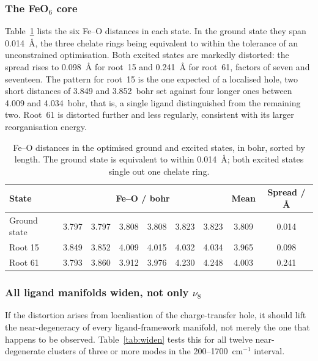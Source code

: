 \documentclass[11pt,a4paper]{article}
\newcommand{\wn}{\ensuremath{\mathrm{cm^{-1}}}}
\begin{document}
\subsubsection*{The FeO$_6$ core}

Table~\ref{tab:feo} lists the six Fe--O distances in each state. In the ground
state they span 0.014~\AA{}, the three chelate rings being equivalent to within
the tolerance of an unconstrained optimisation. Both excited states are
markedly distorted: the spread rises to 0.098~\AA{} for root~15 and 0.241~\AA{}
for root~61, factors of seven and seventeen. The pattern for root~15 is the
one expected of a localised hole, two short distances of 3.849 and
3.852~bohr set against four longer ones between 4.009 and 4.034~bohr, that is,
a single ligand distinguished from the remaining two. Root~61 is distorted
further and less regularly, consistent with its larger reorganisation energy.

\begin{table}[htbp]
\centering
\caption{Fe--O distances in the optimised ground and excited states, in bohr,
sorted by length. The ground state is equivalent to within 0.014~\AA{}; both
excited states single out one chelate ring.}
\label{tab:feo}
\begin{tabular}{l cccccc c c}
\toprule
State & \multicolumn{6}{c}{Fe--O / bohr} & Mean & Spread / \AA{} \\
\midrule
Ground state & 3.797 & 3.797 & 3.808 & 3.808 & 3.823 & 3.823 & 3.809 & 0.014 \\
Root 15      & 3.849 & 3.852 & 4.009 & 4.015 & 4.032 & 4.034 & 3.965 & 0.098 \\
Root 61      & 3.793 & 3.860 & 3.912 & 3.976 & 4.230 & 4.248 & 4.003 & 0.241 \\
\bottomrule
\end{tabular}
\end{table}

\subsubsection*{All ligand manifolds widen, not only $\nu_8$}

If the distortion arises from localisation of the charge-transfer hole, it
should lift the near-degeneracy of every ligand-framework manifold, not merely
the one that happens to be observed. Table~\ref{tab:widen} tests this for all
twelve near-degenerate clusters of three or more modes in the
200--1700~\wn{} interval.
\end{document}
